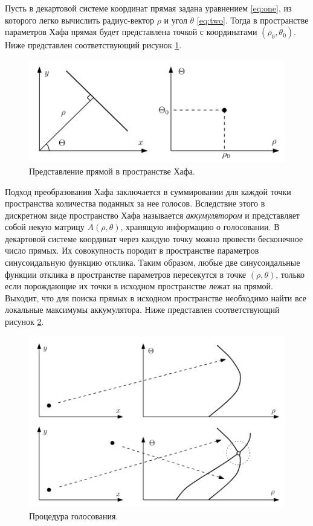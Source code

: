 \documentclass[a4paper, 16pt]{article}
\begin{document}
    \noindent Пусть в декартовой системе координат прямая задана уравнением \eqref{eq:one}, из которого легко вычислить
    радиус-вектор $\rho$ и угол $\theta$ \eqref{eq:two}. Тогда в пространстве параметров Хафа прямая будет представлена
    точкой с координатами $(\rho_0,\theta_0)$. Ниже представлен соответствующий рисунок \ref{Рис:3}.
    \begin{figure}[!htb]
        \centering
        \includegraphics[scale=0.8]{line.png}
        \captionsetup{skip=0pt}
        \caption{Представление прямой в пространстве Хафа.}
        \label{Рис:3}
    \end{figure}


    \noindent Подход преобразования Хафа заключается в суммировании для каждой точки пространства количества поданных за нее голосов.
    Вследствие этого в дискретном виде пространство Хафа называется \textit{аккумулятором} и представляет собой некую матрицу
    $A(\rho,\theta)$, хранящую информацию о голосовании. В декартовой системе координат через каждую точку можно провести бесконечное
    число прямых. Их совокупность породит в пространстве параметров синусоидальную функцию отклика. Таким образом, любые две синусоидальные
    функции отклика в пространстве параметров пересекутся в точке $(\rho,\theta)$, только если порождающие их точки в исходном пространстве
    лежат на прямой. Выходит, что для поиска прямых в исходном пространстве необходимо найти все локальные максимумы аккумулятора. Ниже
    представлен соответствующий рисунок \ref{Рис:4}.
    \begin{figure}[!htb]
        \centering
        \includegraphics[scale=0.8]{voices.png}
        \captionsetup{skip=0pt}
        \caption{Процедура голосования.}
        \label{Рис:4}
    \end{figure}
\end{document}
